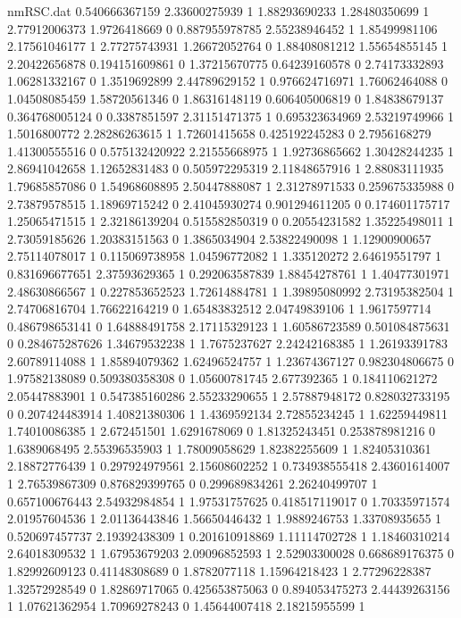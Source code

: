 \begin{filecontents}{nmRSC.dat}
0.540666367159 2.33600275939 1
1.88293690233 1.28480350699 1
2.77912006373 1.9726418669 0
0.887955978785 2.55238946452 1
1.85499981106 2.17561046177 1
2.77275743931 1.26672052764 0
1.88408081212 1.55654855145 1
2.20422656878 0.194151609861 0
1.37215670775 0.64239160578 0
2.74173332893 1.06281332167 0
1.3519692899 2.44789629152 1
0.976624716971 1.76062464088 0
1.04508085459 1.58720561346 0
1.86316148119 0.606405006819 0
1.84838679137 0.364768005124 0
0.3387851597 2.31151471375 1
0.695323634969 2.53219749966 1
1.5016800772 2.28286263615 1
1.72601415658 0.425192245283 0
2.7956168279 1.41300555516 0
0.575132420922 2.21555668975 1
1.92736865662 1.30428244235 1
2.86941042658 1.12652831483 0
0.505972295319 2.11848657916 1
2.88083111935 1.79685857086 0
1.54968608895 2.50447888087 1
2.31278971533 0.259675335988 0
2.73879578515 1.18969715242 0
2.41045930274 0.901294611205 0
0.174601175717 1.25065471515 1
2.32186139204 0.515582850319 0
0.20554231582 1.35225498011 1
2.73059185626 1.20383151563 0
1.3865034904 2.53822490098 1
1.12900900657 2.75114078017 1
0.115069738958 1.04596772082 1
1.335120272 2.64619551797 1
0.831696677651 2.37593629365 1
0.292063587839 1.88454278761 1
1.40477301971 2.48630866567 1
0.227853652523 1.72614884781 1
1.39895080992 2.73195382504 1
2.74706816704 1.76622164219 0
1.65483832512 2.04749839106 1
1.9617597714 0.486798653141 0
1.64888491758 2.17115329123 1
1.60586723589 0.501084875631 0
0.284675287626 1.34679532238 1
1.7675237627 2.24242168385 1
1.26193391783 2.60789114088 1
1.85894079362 1.62496524757 1
1.23674367127 0.982304806675 0
1.97582138089 0.509380358308 0
1.05600781745 2.677392365 1
0.184110621272 2.05447883901 1
0.547385160286 2.55233290655 1
2.57887948172 0.828032733195 0
0.207424483914 1.40821380306 1
1.4369592134 2.72855234245 1
1.62259449811 1.74010086385 1
2.672451501 1.6291678069 0
1.81325243451 0.253878981216 0
1.6389068495 2.55396535903 1
1.78009058629 1.82382255609 1
1.82405310361 2.18872776439 1
0.297924979561 2.15608602252 1
0.734938555418 2.43601614007 1
2.76539867309 0.876829399765 0
0.299689834261 2.26240499707 1
0.657100676443 2.54932984854 1
1.97531757625 0.418517119017 0
1.70335971574 2.01957604536 1
2.01136443846 1.56650446432 1
1.9889246753 1.33708935655 1
0.520697457737 2.19392438309 1
0.201610918869 1.11114702728 1
1.18460310214 2.64018309532 1
1.67953679203 2.09096852593 1
2.52903300028 0.668689176375 0
1.82992609123 0.41148308689 0
1.8782077118 1.15964218423 1
2.77296228387 1.32572928549 0
1.82869717065 0.425653875063 0
0.894053475273 2.44439263156 1
1.07621362954 1.70969278243 0
1.45644007418 2.18215955599 1

\end{filecontents}
